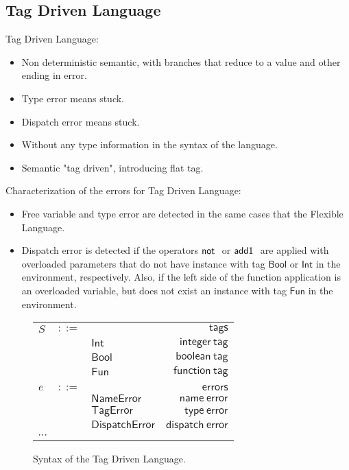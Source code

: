 \documentclass[preprint,authoryear,sort&compress,9pt,nocopyrightspace]{article}
\newcommand{\negacion}[1]{\mathsf{not} \ #1}
\newcommand{\suma}[1]{\mathsf{add1} \ #1}
\newcommand{\boolt}{\mathsf{Bool}}
\newcommand{\intt}{\mathsf{Int}}
\newcommand{\funt}{\mathsf{Fun}}
\newcommand{\nameerror}{\mathsf{NameError}}
\newcommand{\typeerror}{\mathsf{TagError}}
\newcommand{\dispatcherror}{\mathsf{DispatchError}}
\newcommand{\semanticA}{Flexible Language}
\newcommand{\semanticB}{Tag Driven Language}
\begin{document}
\subsection{\semanticB}
\semanticB:
\begin{itemize}\item Non deterministic semantic, with branches that reduce to a value and other ending in error.
\item Type error means stuck.
\item Dispatch error means stuck.
\item Without any type information in the syntax of the language.
\item Semantic "tag driven", introducing flat tag.
\end{itemize}
Characterization of the errors for \semanticB:
\begin{itemize}
\item Free variable and type error are detected in the same cases that the \semanticA.
\item Dispatch error is detected  if the operators $\negacion$ or $\suma$ are applied with overloaded parameters that do not have instance with tag $\boolt$ or $\intt$ in the environment, respectively. Also, if the left side of the function application is an overloaded variable, but does not exist an instance with tag $\funt$ in the environment.
\end{itemize}


\begin{figure}[h]
\begin{small}
\begin{center}
\begin{tabular}{|l c l r|}
\hline
$S$&$::=$&&$\mathsf {tags}$\\
&&$\intt$&$\mathsf {integer \ tag}$\\
&&$\boolt$&$\mathsf {boolean \ tag}$\\
&&$\funt$&$\mathsf {function \ tag}$\\
&&&\\
$e$&$::=$&&$\mathsf {errors}$\\
&&$\nameerror$&$\mathsf {name \ error}$\\
&&$\typeerror$&$\mathsf {type \ error}$\\
&&$\dispatcherror$&$\mathsf {dispatch \ error}$\\
$\cdots$&&&\\
\hline
\end{tabular}
\caption{Syntax of the \semanticB.}
\label{figure:syntax2}
\end{center}
\end{small}
\end{figure}
\end{document}
